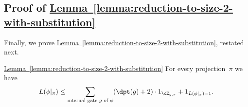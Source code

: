 \documentclass[11pt]{article}
\numberwithin{equation}{section}
\theoremstyle{definition}
\theoremstyle{plain}
\newcommand{\expref}[2]{\hyperref[#2]{#1~\ref{#2}}}
\theoremstyle{definition}\newtheorem{notation}[theorem]{Notation}\theoremstyle{plain}
\begin{document}
\subsection{\label{subsec:reduction-to-size-2-with-substitution}Proof of \expref{Lemma}{lemma:reduction-to-size-2-with-substitution}}

Finally, we prove \expref{Lemma}{lemma:reduction-to-size-2-with-substitution},
restated next.
\begin{restated}{\expref{Lemma}{lemma:reduction-to-size-2-with-substitution}}
For every projection~$\pi$ we have 
\begin{equation}
L(\phi|_{\pi})\le\sum_{\text{internal gate \ensuremath{g} of \ensuremath{\phi}}}(\dpt(g)+2)\cdot1_{\cE_{g,\pi}}+1_{L(\phi|_{\pi})=1}.\label{eq:reduction-to-size-2-with-substitution}
\end{equation}
\end{restated}
\end{document}
